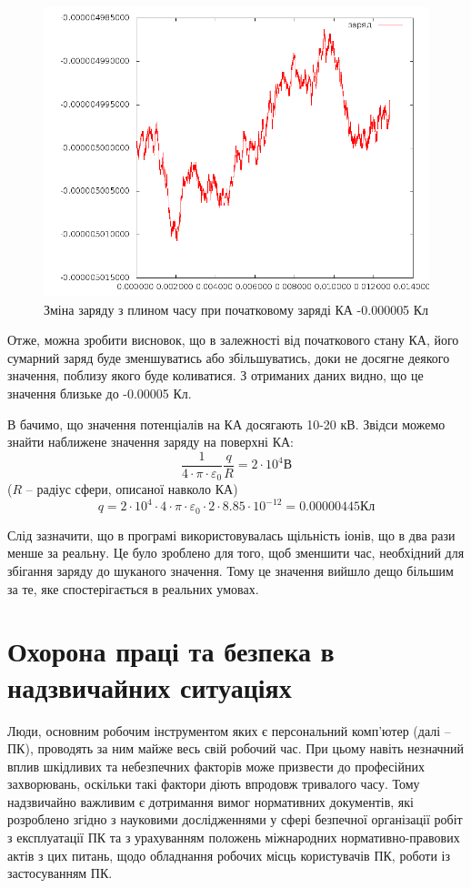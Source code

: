 \documentclass[a4paper,12pt]{article}
\begin{document}
\begin{figure}[!htp]
\centering
\includegraphics[scale=0.50]{screens/000005_txt.png}
\caption{Зміна заряду з плином часу при початковому заряді КА -0.000005 Кл}
\end{figure}

Отже, можна зробити висновок, що в залежності від початкового стану КА, його сумарний заряд буде зменшуватись або збільшуватись, доки не досягне деякого значення, поблизу якого буде коливатися. З отриманих даних видно, що це значення близьке до -0.00005 Кл.

В \cite{novikov} бачимо, що значення потенціалів на КА досягають 10-20 кВ. Звідси можемо знайти наближене значення заряду на поверхні КА:
\[
\frac{1}{4 \cdot \pi \cdot \varepsilon_0} \frac{q}{R}  = 2 \cdot 10^4 \text{В}
\]
($R$ -- радіус сфери, описаної навколо КА)
\[
q = 2 \cdot 10^4 \cdot 4 \cdot \pi \cdot \varepsilon_0 \cdot 2 \cdot 8.85 \cdot 10^{-12} = 0.00000445 \text{Кл}
\]

Слід зазначити, що в програмі використовувалась щільність іонів, що в два рази менше за реальну. Це було зроблено для того, щоб зменшити час, необхідний для збігання заряду до шуканого значення. Тому це значення вийшло дещо більшим за те, яке спостерігається в реальних умовах.



\newpage
\section{Охорона праці та безпека в надзвичайних ситуаціях}

Люди, основним робочим інструментом яких є персональний комп’ютер (далі -- ПК), проводять за ним майже весь свій робочий час. При цьому навіть незначний вплив шкідливих та небезпечних факторів може призвести до професійних захворювань, оскільки такі фактори діють впродовж тривалого часу. Тому надзвичайно важливим є дотримання вимог нормативних документів, які розроблено згідно з  науковими дослідженнями у сфері безпечної організації робіт з експлуатації ПК та з урахуванням положень міжнародних нормативно-правових актів з цих питань, щодо обладнання робочих місць користувачів ПК, роботи із застосуванням ПК.
\end{document}
